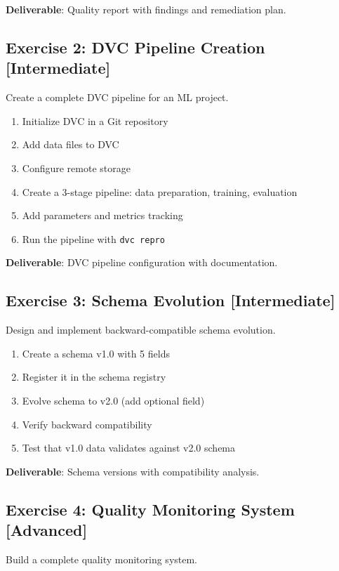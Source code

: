 \textbf{Deliverable}: Quality report with findings and remediation plan.

\subsection{Exercise 2: DVC Pipeline Creation [Intermediate]}

Create a complete DVC pipeline for an ML project.

\begin{enumerate}
    \item Initialize DVC in a Git repository
    \item Add data files to DVC
    \item Configure remote storage
    \item Create a 3-stage pipeline: data preparation, training, evaluation
    \item Add parameters and metrics tracking
    \item Run the pipeline with \texttt{dvc repro}
\end{enumerate}

\textbf{Deliverable}: DVC pipeline configuration with documentation.

\subsection{Exercise 3: Schema Evolution [Intermediate]}

Design and implement backward-compatible schema evolution.

\begin{enumerate}
    \item Create a schema v1.0 with 5 fields
    \item Register it in the schema registry
    \item Evolve schema to v2.0 (add optional field)
    \item Verify backward compatibility
    \item Test that v1.0 data validates against v2.0 schema
\end{enumerate}

\textbf{Deliverable}: Schema versions with compatibility analysis.

\subsection{Exercise 4: Quality Monitoring System [Advanced]}

Build a complete quality monitoring system.

